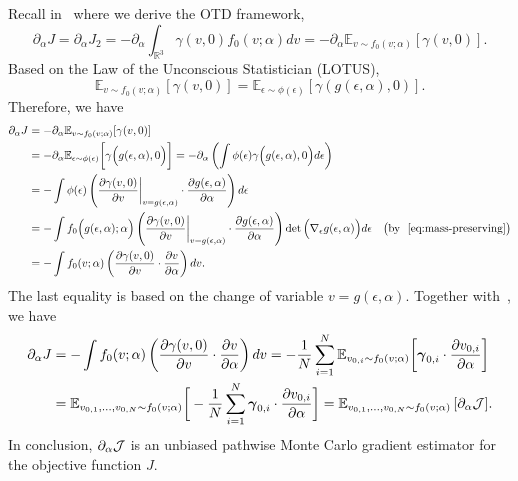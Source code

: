 \documentclass[times,final,nopreprintline]{elsarticle}
\newcommand{\bbR}{\mathbb R} \newcommand{\bbS}{\mathbb S}
\newcommand{\bgamma}{\boldsymbol \gamma}
\newcommand{\Rthree}{{\bbR^3}}
\begin{document}
Recall in~ where we derive the OTD framework, 
\[\partial_\alpha J = \partial_\alpha J_2 = -\partial_\alpha \int_\Rthree \gamma(v,0)f_0(v;\alpha) dv = -\partial_\alpha \mathbb{E}_{v\sim f_0(v;\alpha)}[\gamma(v,0)].
\]
Based on the Law of the Unconscious Statistician (LOTUS),
\begin{equation}
    \mathbb{E}_{v\sim f_0(v;\alpha)}[\gamma(v,0)] = \mathbb{E}_{\epsilon\sim \phi(\epsilon)}[\gamma(g(\epsilon,\alpha),0)].
\end{equation}
Therefore, we have
\begin{align*}
    \partial_\alpha J  &=  -\partial_\alpha \mathbb{E}_{v\sim f_0(v;\alpha)}[\gamma(v,0)]\\
    & =  -\partial_\alpha \mathbb{E}_{\epsilon\sim \phi(\epsilon)}\bigg[\gamma\Big(g(\epsilon,\alpha),0\Big)\bigg]= -\partial_\alpha \left(\int \phi(\epsilon) \gamma \Big(g(\epsilon,\alpha),0 \Big) d\epsilon\right)\\
    & = -\int \phi(\epsilon)\left( \frac{\partial \gamma(v,0)}{\partial v}\bigg|_{v=g(\epsilon,\alpha)}\cdot \frac{\partial g(\epsilon,\alpha)}{\partial \alpha}\right) d\epsilon\\
     & = -\int f_0\Big(g(\epsilon,\alpha); \alpha\Big) \left( \frac{\partial \gamma(v,0)}{\partial v}\bigg|_{v=g(\epsilon,\alpha)}\cdot \frac{\partial g(\epsilon,\alpha)}{\partial \alpha}\right) \det{ \Big(\nabla_\epsilon g(\epsilon,\alpha) \Big)} d\epsilon \quad \text{\big(by ~\Cref{eq:mass-preserving}\big)}\\
    & = -\int f_0(v;\alpha)\left( \frac{\partial \gamma(v,0)}{\partial v} \cdot \frac{\partial v}{\partial \alpha}\right) dv.
\end{align*}
The last equality is based on the change of variable $v = g(\epsilon,\alpha)$. Together with~, we have
\begin{align*}
    \partial_\alpha J  & = -\int f_0(v;\alpha) \left(\frac{\partial \gamma(v,0)}{\partial v} \cdot \frac{\partial v}{\partial \alpha} \right)dv  = - \frac{1}{N}\sum_{i=1}^N \mathbb {E}_{v_{0,i}\sim f_0(v;\alpha)} \bigg[ \bgamma_{0,i} \cdot \frac{\partial v_{0,i}}{\partial \alpha} \bigg]\\
& =  \mathbb{E}_{v_{0,1},\ldots, v_{0,N}\sim f_0(v;\alpha)} \bigg[- \frac{1}{N}\sum_{i=1}^N \bgamma_{0,i}\cdot \frac{\partial v_{0,i}}{\partial \alpha} \bigg]=  \mathbb{E}_{v_{0,1},\ldots, v_{0,N}\sim f_0(v;\alpha)} \, [\partial_\alpha \cJ].
\end{align*}
In conclusion, $\partial_\alpha \mathcal J$ is an unbiased pathwise Monte Carlo gradient estimator for the objective function $J$.
\end{document}
